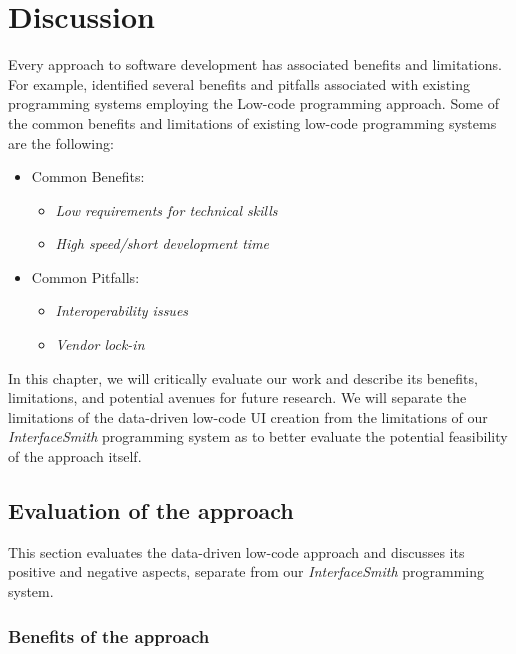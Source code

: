\chapter{Discussion}
\label{chap:discussion}

Every approach to software development has associated benefits and limitations.
For example, \citet{Pinho_Aguiar_Amaral_2023} identified several benefits and pitfalls associated with existing programming systems employing the Low-code programming approach.
Some of the common benefits and limitations of existing low-code programming systems are the following:
\begin{itemize}
	\item Common Benefits:
	      \begin{itemize}
		      \item \emph{Low requirements for technical skills}
		      \item \emph{High speed/short development time}
	      \end{itemize}

	\item Common Pitfalls:
	      \begin{itemize}
		      \item \emph{Interoperability issues}
		      \item \emph{Vendor lock-in}
	      \end{itemize}
\end{itemize}

\noindent In this chapter, we will critically evaluate our work and describe its benefits, limitations, and potential avenues for future research.
We will separate the limitations of the data-driven low-code UI creation from the limitations of our \emph{InterfaceSmith} programming system as to
better evaluate the potential feasibility of the approach itself.
\medskip
\section{Evaluation of the approach}
This section evaluates the data-driven low-code approach and discusses its positive and negative aspects, separate from our \emph{InterfaceSmith} programming system.

\subsection{Benefits of the approach}

